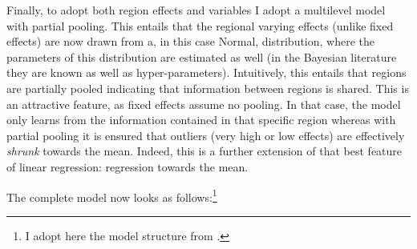 \documentclass[fleqn,10pt]{SelfArx} %
\begin{document}
        Finally, to adopt both region effects and variables I adopt a
        multilevel model with partial pooling. This entails that the
        regional varying effects (unlike fixed effects) are now
        drawn from a, in this case Normal, distribution, where the
        parameters of this distribution are estimated as well (in the
        Bayesian literature they are known as well as hyper-parameters). 
        Intuitively, this entails that regions are partially pooled 
        indicating that information between regions is shared. This is an attractive feature, as fixed effects assume no
        pooling. In that case, the model only learns from the information contained
        in that specific region whereas with partial pooling it is ensured that
        outliers (very high or low effects) are effectively
        \emph{shrunk} towards the mean. Indeed, this is a further
        extension of that best feature of linear regression:
        regression towards the mean.

        The complete model now looks as follows:\footnote{I adopt here the model structure from \citet{mcelreath2018statistical}.}
        
\end{document}
